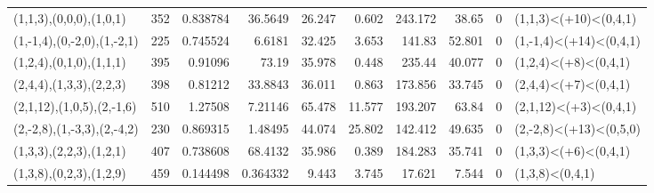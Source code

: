 \begin{tabular}{lrrrrrrrrl}
 (1,1,3),(0,0,0),(1,0,1)    &  352   &  0.838784 &   36.5649   &       26.247 &      0.602 &          243.172 &         38.65  &        0 & (1,1,3)<(+10)<(0,4,1)   \\
 (1,-1,4),(0,-2,0),(1,-2,1) &  225   &  0.745524 &    6.6181   &       32.425 &      3.653 &          141.83  &         52.801 &        0 & (1,-1,4)<(+14)<(0,4,1)  \\
 (1,2,4),(0,1,0),(1,1,1)    &  395   &  0.91096  &   73.19     &       35.978 &      0.448 &          235.44  &         40.077 &        0 & (1,2,4)<(+8)<(0,4,1)    \\
 (2,4,4),(1,3,3),(2,2,3)    &  398   &  0.81212  &   33.8843   &       36.011 &      0.863 &          173.856 &         33.745 &        0 & (2,4,4)<(+7)<(0,4,1)    \\
 (2,1,12),(1,0,5),(2,-1,6)  &  510   &  1.27508  &    7.21146  &       65.478 &     11.577 &          193.207 &         63.84  &        0 & (2,1,12)<(+3)<(0,4,1)   \\
 (2,-2,8),(1,-3,3),(2,-4,2) &  230   &  0.869315 &    1.48495  &       44.074 &     25.802 &          142.412 &         49.635 &        0 & (2,-2,8)<(+13)<(0,5,0)  \\
 (1,3,3),(2,2,3),(1,2,1)    &  407   &  0.738608 &   68.4132   &       35.986 &      0.389 &          184.283 &         35.741 &        0 & (1,3,3)<(+6)<(0,4,1)    \\
 (1,3,8),(0,2,3),(1,2,9)    &  459   &  0.144498 &    0.364332 &        9.443 &      3.745 &           17.621 &          7.544 &        0 & (1,3,8)<(0,4,1)         \\
\hline
\end{tabular}